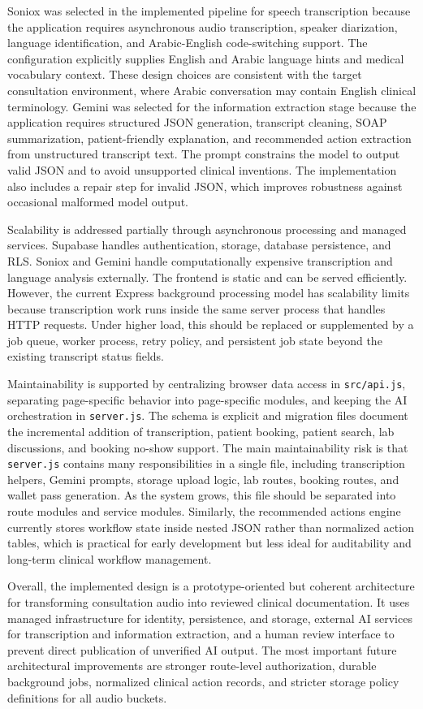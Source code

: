 Soniox was selected in the implemented pipeline for speech transcription because the application requires asynchronous audio transcription, speaker diarization, language identification, and Arabic-English code-switching support. The configuration explicitly supplies English and Arabic language hints and medical vocabulary context. These design choices are consistent with the target consultation environment, where Arabic conversation may contain English clinical terminology. Gemini was selected for the information extraction stage because the application requires structured JSON generation, transcript cleaning, SOAP summarization, patient-friendly explanation, and recommended action extraction from unstructured transcript text. The prompt constrains the model to output valid JSON and to avoid unsupported clinical inventions. The implementation also includes a repair step for invalid JSON, which improves robustness against occasional malformed model output.

Scalability is addressed partially through asynchronous processing and managed services. Supabase handles authentication, storage, database persistence, and RLS. Soniox and Gemini handle computationally expensive transcription and language analysis externally. The frontend is static and can be served efficiently. However, the current Express background processing model has scalability limits because transcription work runs inside the same server process that handles HTTP requests. Under higher load, this should be replaced or supplemented by a job queue, worker process, retry policy, and persistent job state beyond the existing transcript status fields.

Maintainability is supported by centralizing browser data access in \texttt{src/api.js}, separating page-specific behavior into page-specific modules, and keeping the AI orchestration in \texttt{server.js}. The schema is explicit and migration files document the incremental addition of transcription, patient booking, patient search, lab discussions, and booking no-show support. The main maintainability risk is that \texttt{server.js} contains many responsibilities in a single file, including transcription helpers, Gemini prompts, storage upload logic, lab routes, booking routes, and wallet pass generation. As the system grows, this file should be separated into route modules and service modules. Similarly, the recommended actions engine currently stores workflow state inside nested JSON rather than normalized action tables, which is practical for early development but less ideal for auditability and long-term clinical workflow management.

Overall, the implemented design is a prototype-oriented but coherent architecture for transforming consultation audio into reviewed clinical documentation. It uses managed infrastructure for identity, persistence, and storage, external AI services for transcription and information extraction, and a human review interface to prevent direct publication of unverified AI output. The most important future architectural improvements are stronger route-level authorization, durable background jobs, normalized clinical action records, and stricter storage policy definitions for all audio buckets.
